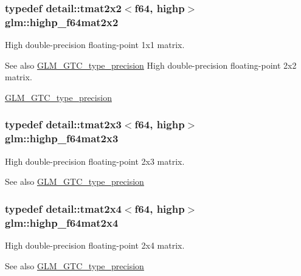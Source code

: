 \subsubsection[{\texorpdfstring{highp\+\_\+f64mat2x2}{highp_f64mat2x2}}]{\setlength{\rightskip}{0pt plus 5cm}typedef detail\+::tmat2x2$<$f64, highp$>$ {\bf glm\+::highp\+\_\+f64mat2x2}}\hypertarget{group__gtc__type__precision_ga4babca568fc88f185620c02e4fdac0d8}{}\label{group__gtc__type__precision_ga4babca568fc88f185620c02e4fdac0d8}
High double-\/precision floating-\/point 1x1 matrix. \begin{DoxySeeAlso}{See also}
\hyperlink{group__gtc__type__precision}{G\+L\+M\+\_\+\+G\+T\+C\+\_\+type\+\_\+precision} High double-\/precision floating-\/point 2x2 matrix. 

\hyperlink{group__gtc__type__precision}{G\+L\+M\+\_\+\+G\+T\+C\+\_\+type\+\_\+precision} 
\end{DoxySeeAlso}
\subsubsection[{\texorpdfstring{highp\+\_\+f64mat2x3}{highp_f64mat2x3}}]{\setlength{\rightskip}{0pt plus 5cm}typedef detail\+::tmat2x3$<$f64, highp$>$ {\bf glm\+::highp\+\_\+f64mat2x3}}\hypertarget{group__gtc__type__precision_gafb5b42b29b3bd7f1605483223fa35312}{}\label{group__gtc__type__precision_gafb5b42b29b3bd7f1605483223fa35312}
High double-\/precision floating-\/point 2x3 matrix. \begin{DoxySeeAlso}{See also}
\hyperlink{group__gtc__type__precision}{G\+L\+M\+\_\+\+G\+T\+C\+\_\+type\+\_\+precision} 
\end{DoxySeeAlso}
\subsubsection[{\texorpdfstring{highp\+\_\+f64mat2x4}{highp_f64mat2x4}}]{\setlength{\rightskip}{0pt plus 5cm}typedef detail\+::tmat2x4$<$f64, highp$>$ {\bf glm\+::highp\+\_\+f64mat2x4}}\hypertarget{group__gtc__type__precision_ga72fae79e6633cbc6bf691f69278b36d3}{}\label{group__gtc__type__precision_ga72fae79e6633cbc6bf691f69278b36d3}
High double-\/precision floating-\/point 2x4 matrix. \begin{DoxySeeAlso}{See also}
\hyperlink{group__gtc__type__precision}{G\+L\+M\+\_\+\+G\+T\+C\+\_\+type\+\_\+precision} 
\end{DoxySeeAlso}
